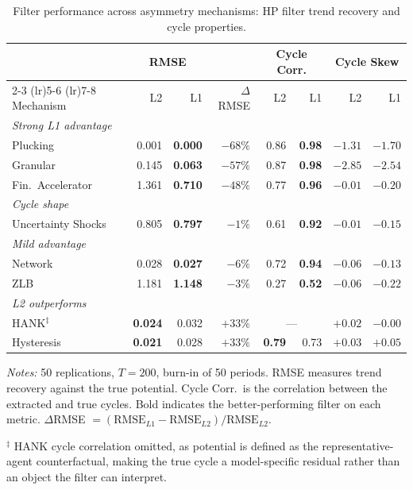 \documentclass[10pt]{article}
\begin{document}
\begin{table}[htbp]
\centering
\caption{Filter performance across asymmetry mechanisms: HP filter trend recovery and cycle properties.}
\label{tab:structural_results}
\begin{tabular}{l rr r rr rr}
\toprule
& \multicolumn{2}{c}{RMSE} & & \multicolumn{2}{c}{Cycle Corr.} & \multicolumn{2}{c}{Cycle Skew} \\
\cmidrule(lr){2-3} \cmidrule(lr){5-6} \cmidrule(lr){7-8}
Mechanism & L2 & L1 & $\Delta$RMSE & L2 & L1 & L2 & L1 \\
\midrule
\multicolumn{8}{l}{\textit{Strong L1 advantage}} \\
Plucking            & 0.001 & \textbf{0.000} &  $-68\%$ & 0.86 & \textbf{0.98} & $-1.31$ & $-1.70$ \\
Granular            & 0.145 & \textbf{0.063} &  $-57\%$ & 0.87 & \textbf{0.98} & $-2.85$ & $-2.54$ \\
Fin.\ Accelerator   & 1.361 & \textbf{0.710} &  $-48\%$ & 0.77 & \textbf{0.96} & $-0.01$ & $-0.20$ \\
\midrule
\multicolumn{8}{l}{\textit{Cycle shape}} \\
Uncertainty Shocks  & 0.805 & \textbf{0.797} &   $-1\%$ & 0.61 & \textbf{0.92} & $-0.01$ & $-0.15$ \\
\midrule
\multicolumn{8}{l}{\textit{Mild advantage}} \\
Network             & 0.028 & \textbf{0.027} &   $-6\%$ & 0.72 & \textbf{0.94} & $-0.06$ & $-0.13$ \\
ZLB                 & 1.181 & \textbf{1.148} &   $-3\%$ & 0.27 & \textbf{0.52} & $-0.06$ & $-0.22$ \\
\midrule
\multicolumn{8}{l}{\textit{L2 outperforms}} \\
HANK$^\ddagger$     & \textbf{0.024} & 0.032 & $+33\%$ & \multicolumn{2}{c}{---} & $+0.02$ & $-0.00$ \\
Hysteresis          & \textbf{0.021} & 0.028 & $+33\%$ & \textbf{0.79} & 0.73 & $+0.03$ & $+0.05$ \\
\bottomrule
\end{tabular}
\begin{tablenotes}
\small
\item \textit{Notes:} 50 replications, $T = 200$, burn-in of 50 periods. RMSE measures trend recovery against the true potential. Cycle Corr.\ is the correlation between the extracted and true cycles. Bold indicates the better-performing filter on each metric. $\Delta$RMSE $= (\text{RMSE}_{L1} - \text{RMSE}_{L2}) / \text{RMSE}_{L2}$.
\item $^\ddagger$ HANK cycle correlation omitted, as potential is defined as the representative-agent counterfactual, making the true cycle a model-specific residual rather than an object the filter can interpret.
\end{tablenotes}
\end{table}
\end{document}
